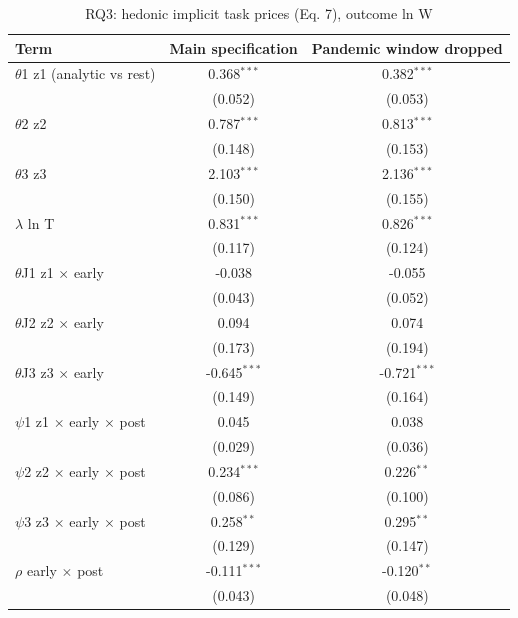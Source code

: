 \begin{table}[htbp]\centering
\caption{RQ3: hedonic implicit task prices (Eq. 7), outcome ln W}
\begin{tabular}{lcc}
\toprule
Term & Main specification & Pandemic window dropped \\
\midrule
$\theta$1  z1 (analytic vs rest) & 0.368$^{***}$ & 0.382$^{***}$ \\
 & (0.052) & (0.053) \\
$\theta$2  z2 & 0.787$^{***}$ & 0.813$^{***}$ \\
 & (0.148) & (0.153) \\
$\theta$3  z3 & 2.103$^{***}$ & 2.136$^{***}$ \\
 & (0.150) & (0.155) \\
$\lambda$  ln T & 0.831$^{***}$ & 0.826$^{***}$ \\
 & (0.117) & (0.124) \\
$\theta$J1  z1 $\times$ early & -0.038 & -0.055 \\
 & (0.043) & (0.052) \\
$\theta$J2  z2 $\times$ early & 0.094 & 0.074 \\
 & (0.173) & (0.194) \\
$\theta$J3  z3 $\times$ early & -0.645$^{***}$ & -0.721$^{***}$ \\
 & (0.149) & (0.164) \\
$\psi$1  z1 $\times$ early $\times$ post & 0.045 & 0.038 \\
 & (0.029) & (0.036) \\
$\psi$2  z2 $\times$ early $\times$ post & 0.234$^{***}$ & 0.226$^{**}$ \\
 & (0.086) & (0.100) \\
$\psi$3  z3 $\times$ early $\times$ post & 0.258$^{**}$ & 0.295$^{**}$ \\
 & (0.129) & (0.147) \\
$\rho$  early $\times$ post & -0.111$^{***}$ & -0.120$^{**}$ \\
 & (0.043) & (0.048) \\
\bottomrule
\end{tabular}
\par\vspace{2pt}{\footnotesize State-by-quarter and industry fixed effects; controls sex, age, education. Standard errors clustered on occupation in parentheses. * p<0.10, ** p<0.05, *** p<0.01. Not shown because identical to the main specification (Eq. 7 does not use exposure): GPT-4-rated exposure, LM-AIOE exposure.}
\end{table}
